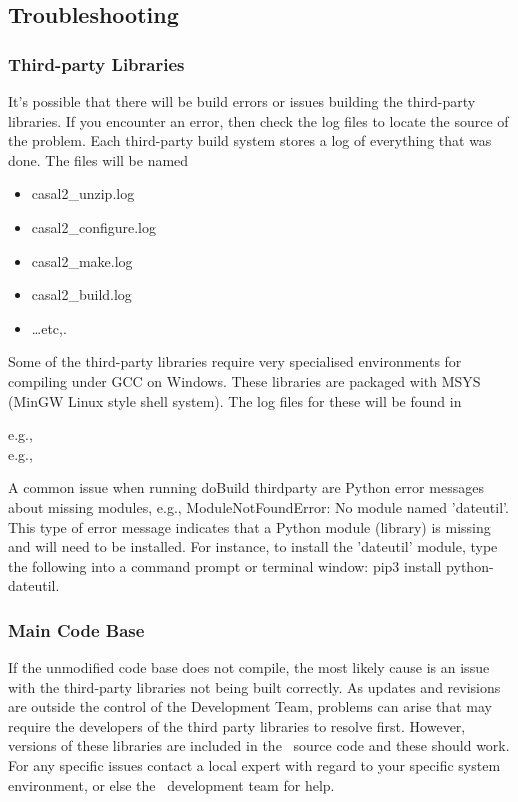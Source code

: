 \subsection{Troubleshooting}

\subsubsection{Third-party Libraries}

It's possible that there will be build errors or issues building the third-party libraries. If you encounter an error, then check the log files to locate the source of the problem. Each third-party build system stores a log of everything that was done. The files will be named

\begin{itemize}
	\item casal2\_unzip.log
	\item casal2\_configure.log
	\item casal2\_make.log
	\item casal2\_build.log
	\item \dots etc,.
\end{itemize}

Some of the third-party libraries require very specialised environments for compiling under GCC on Windows. These libraries are packaged with MSYS (MinGW Linux style shell system). The log files for these will be found in 

e.g., \\
e.g., 

A common issue when running doBuild thirdparty are Python error messages about missing modules, e.g., ModuleNotFoundError: No module named 'dateutil'. This type of error message indicates that a Python module (library) is missing and will need to be installed. For instance, to install the 'dateutil' module, type the following into a command prompt or terminal window: pip3 install python-dateutil.  

\subsubsection{Main Code Base}

If the unmodified code base does not compile, the most likely cause is an issue with the third-party libraries not being built correctly. As updates and revisions are outside the control of the Development Team, problems can arise that may require the developers of the third party libraries to resolve first. However, versions of these libraries are included in the \CNAME\ source code and these should work. For any specific issues contact a local expert with regard to your specific system environment, or else the \CNAME\ development team for help.



